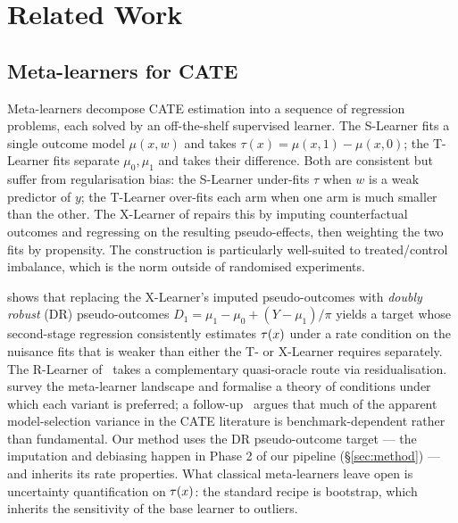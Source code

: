 \section{Related Work}
\label{sec:related}

\subsection{Meta-learners for CATE}
\label{sec:related:xlearner}
Meta-learners decompose CATE estimation into a sequence of regression
problems, each solved by an off-the-shelf supervised learner. The
S-Learner fits a single outcome model $\mu(x, w)$ and takes
$\tau(x) = \mu(x, 1) - \mu(x, 0)$; the T-Learner fits separate
$\mu_0, \mu_1$ and takes their difference. Both are consistent but
suffer from regularisation bias: the S-Learner under-fits $\tau$
when $w$ is a weak predictor of $y$; the T-Learner over-fits each
arm when one arm is much smaller than the other. The X-Learner of
\citet{kunzel2019metalearners} repairs this by imputing
counterfactual outcomes and regressing on the resulting pseudo-effects,
then weighting the two fits by propensity. The construction is
particularly well-suited to treated/control imbalance, which is the
norm outside of randomised experiments.

\citet{kennedy2020optimal} shows that replacing the X-Learner's
imputed pseudo-outcomes with \emph{doubly robust} (DR) pseudo-outcomes
$D_1 = \mu_1 - \mu_0 + (Y - \mu_1)/\pi$ yields a target whose
second-stage regression consistently estimates $\tau(x)$ under a rate
condition on the nuisance fits that is weaker than either the T- or
X-Learner requires separately. The R-Learner of~\citet{nie2021quasi}
takes a complementary quasi-oracle route via residualisation.
\citet{curth2021nonparametric} survey the meta-learner landscape and
formalise a theory of conditions under which each
variant is preferred; a follow-up~\citep{curth2023search} argues that
much of the apparent model-selection variance in the CATE literature
is benchmark-dependent rather than fundamental. Our method uses the
DR pseudo-outcome target --- the imputation and debiasing happen in
Phase 2 of our pipeline (\S\ref{sec:method}) --- and inherits
its rate properties.
What classical meta-learners leave open is uncertainty quantification
on $\tau(x)$: the standard recipe is bootstrap, which inherits the
sensitivity of the base learner to outliers.

